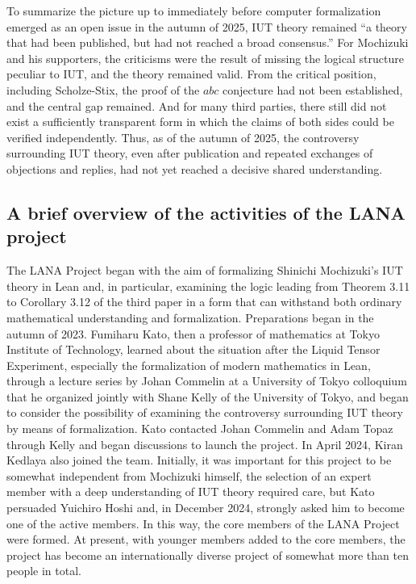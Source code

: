 \documentclass[12pt, reqno, a4paper]{amsart}
\begin{document}
To summarize the picture up to immediately before computer formalization emerged as an open issue in the autumn of 2025, IUT theory remained ``a theory that had been published, but had not reached a broad consensus.'' For Mochizuki and his supporters, the criticisms were the result of missing the logical structure peculiar to IUT, and the theory remained valid. From the critical position, including Scholze-Stix, the proof of the $abc$ conjecture had not been established, and the central gap remained. And for many third parties, there still did not exist a sufficiently transparent form in which the claims of both sides could be verified independently. Thus, as of the autumn of 2025, the controversy surrounding IUT theory, even after publication and repeated exchanges of objections and replies, had not yet reached a decisive shared understanding.

\subsection{A brief overview of the activities of the LANA project}
The LANA Project began with the aim of formalizing Shinichi Mochizuki's IUT theory in Lean and, in particular, examining the logic leading from Theorem 3.11 to Corollary 3.12 of the third paper in a form that can withstand both ordinary mathematical understanding and formalization. Preparations began in the autumn of 2023. Fumiharu Kato, then a professor of mathematics at Tokyo Institute of Technology, learned about the situation after the Liquid Tensor Experiment, especially the formalization of modern mathematics in Lean, through a lecture series by Johan Commelin at a University of Tokyo colloquium that he organized jointly with Shane Kelly of the University of Tokyo, and began to consider the possibility of examining the controversy surrounding IUT theory by means of formalization. Kato contacted Johan Commelin and Adam Topaz through Kelly and began discussions to launch the project. In April 2024, Kiran Kedlaya also joined the team. Initially, it was important for this project to be somewhat independent from Mochizuki himself, the selection of an expert member with a deep understanding of IUT theory required care, but Kato persuaded Yuichiro Hoshi and, in December 2024, strongly asked him to become one of the active members. In this way, the core members of the LANA Project were formed. At present, with younger members added to the core members, the project has become an internationally diverse project of somewhat more than ten people in total.
\end{document}
